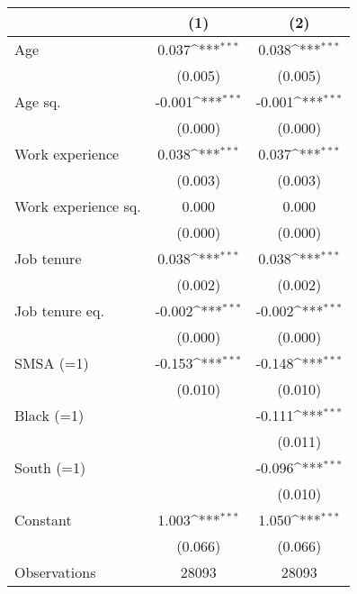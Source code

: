 {
\def\sym#1{\ifmmode^{#1}\else\(^{#1}\)\fi}
\begin{tabular}{l*{2}{c}}
\toprule
                    &\multicolumn{1}{c}{(1)}         &\multicolumn{1}{c}{(2)}         \\
\midrule
Age                 &       0.037\sym{***}&       0.038\sym{***}\\
                    &     (0.005)         &     (0.005)         \\
\addlinespace
Age sq.             &      -0.001\sym{***}&      -0.001\sym{***}\\
                    &     (0.000)         &     (0.000)         \\
\addlinespace
Work experience     &       0.038\sym{***}&       0.037\sym{***}\\
                    &     (0.003)         &     (0.003)         \\
\addlinespace
Work experience sq. &       0.000         &       0.000         \\
                    &     (0.000)         &     (0.000)         \\
\addlinespace
Job tenure          &       0.038\sym{***}&       0.038\sym{***}\\
                    &     (0.002)         &     (0.002)         \\
\addlinespace
Job tenure eq.      &      -0.002\sym{***}&      -0.002\sym{***}\\
                    &     (0.000)         &     (0.000)         \\
\addlinespace
SMSA (=1)           &      -0.153\sym{***}&      -0.148\sym{***}\\
                    &     (0.010)         &     (0.010)         \\
\addlinespace
Black (=1)          &                     &      -0.111\sym{***}\\
                    &                     &     (0.011)         \\
\addlinespace
South (=1)          &                     &      -0.096\sym{***}\\
                    &                     &     (0.010)         \\
\addlinespace
Constant            &       1.003\sym{***}&       1.050\sym{***}\\
                    &     (0.066)         &     (0.066)         \\
\midrule
Observations        &       28093         &       28093         \\
\bottomrule
\end{tabular}
}
